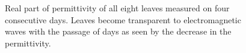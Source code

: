 \documentclass[journal,article,submit,moreauthors,pdftex]{Definitions/mdpi}
\renewcommand{\^}{\hat}  %
\begin{document}
\begin{figure}[h!]
	\addtocounter{subfigure}{4}
	\centering
	\label{fig:lettuce_eps}
	\hfill
	\label{fig:parsley_eps}
	
	\label{fig:peashoot_eps}
	\hfill
	\label{fig:spinach_eps}
	\caption{Real part of permittivity of all eight leaves measured on four consecutive days. Leaves become transparent to electromagnetic waves with the passage of days as seen by the decrease in the permittivity.}
	\label{fig:Permittivity_all_leaves}
\end{figure}
\end{document}
